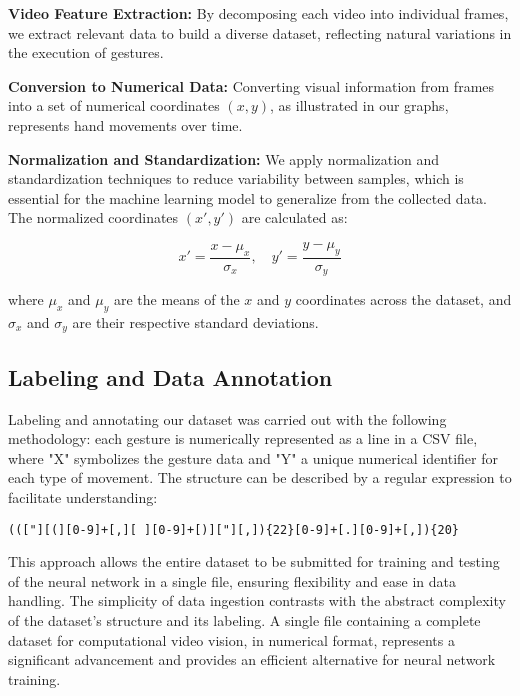 \documentclass{article}
\begin{document}
\textbf{Video Feature Extraction:} By decomposing each video into individual frames, we extract relevant data to build a diverse dataset, reflecting natural variations in the execution of gestures.

\textbf{Conversion to Numerical Data:} Converting visual information from frames into a set of numerical coordinates $(x, y)$, as illustrated in our graphs, represents hand movements over time.

\textbf{Normalization and Standardization:} We apply normalization and standardization techniques to reduce variability between samples, which is essential for the machine learning model to generalize from the collected data. The normalized coordinates $(x', y')$ are calculated as:

\begin{equation}
x' = \frac{x - \mu_x}{\sigma_x}, \quad y' = \frac{y - \mu_y}{\sigma_y}
\end{equation}

where $\mu_x$ and $\mu_y$ are the means of the $x$ and $y$ coordinates across the dataset, and $\sigma_x$ and $\sigma_y$ are their respective standard deviations.


\subsection{Labeling and Data Annotation}

Labeling and annotating our dataset was carried out with the following methodology: each gesture is numerically represented as a line in a CSV file, where "X" symbolizes the gesture data and "Y" a unique numerical identifier for each type of movement. The structure can be described by a regular expression to facilitate understanding:

\begin{verbatim}
((["][(][0-9]+[,][ ][0-9]+[)]["][,]){22}[0-9]+[.][0-9]+[,]){20}
\end{verbatim}

This approach allows the entire dataset to be submitted for training and testing of the neural network in a single file, ensuring flexibility and ease in data handling. The simplicity of data ingestion contrasts with the abstract complexity of the dataset's structure and its labeling. A single file containing a complete dataset for computational video vision, in numerical format, represents a significant advancement and provides an efficient alternative for neural network training.
\end{document}
